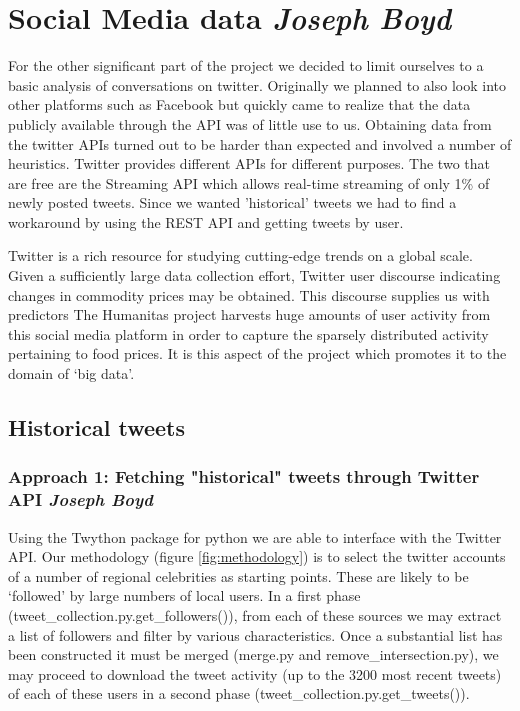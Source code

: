 \section*{Social Media data \footnotesize\emph{Joseph Boyd}}
For the other significant part of the project we decided to limit ourselves to a basic analysis of conversations on twitter. Originally we planned to also look into other platforms such as Facebook but quickly came to realize that the data publicly available through the API was of little use to us. Obtaining data from the twitter APIs turned out to be harder than expected and involved a number of heuristics. Twitter provides different APIs for different purposes. The two that are free are the Streaming API which allows real-time streaming of only 1\% of newly posted tweets. Since we wanted 'historical' tweets we had to find a workaround by using the REST API and getting tweets by user.\par
Twitter is a rich resource for studying cutting-edge trends on a global scale. Given a sufficiently large data collection effort, Twitter user discourse indicating changes in commodity prices may be obtained. This discourse supplies us with predictors The Humanitas project harvests huge amounts of user activity from this social media platform in order to capture the sparsely distributed activity pertaining to food prices. It is this aspect of the project which promotes it to the domain of `big data'.

\subsection*{Historical tweets}
\subsubsection*{Approach 1: Fetching "historical" tweets through Twitter API \footnotesize\emph{Joseph Boyd}}
Using the Twython package for python we are able to interface with the Twitter API. Our methodology (figure \ref{fig:methodology}) is to select the twitter accounts of a number of regional celebrities as starting points. These are likely to be `followed' by large numbers of local users. In a first phase (tweet\_collection.py.get\_followers()), from each of these sources we may extract a list of followers and filter by various characteristics. Once a substantial list has been constructed it must be merged (merge.py and remove\_intersection.py), we may proceed to download the tweet activity (up to the 3200 most recent tweets) of each of these users in a second phase (tweet\_collection.py.get\_tweets()).

